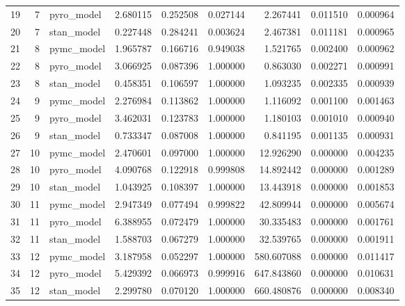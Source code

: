 \begin{tabular}{lrlrrrrrr}
19 & 7 & pyro_model & 2.680115 & 0.252508 & 0.027144 & 2.267441 & 0.011510 & 0.000964 \\
20 & 7 & stan_model & 0.227448 & 0.284241 & 0.003624 & 2.467381 & 0.011181 & 0.000965 \\
21 & 8 & pymc_model & 1.965787 & 0.166716 & 0.949038 & 1.521765 & 0.002400 & 0.000962 \\
22 & 8 & pyro_model & 3.066925 & 0.087396 & 1.000000 & 0.863030 & 0.002271 & 0.000991 \\
23 & 8 & stan_model & 0.458351 & 0.106597 & 1.000000 & 1.093235 & 0.002335 & 0.000939 \\
24 & 9 & pymc_model & 2.276984 & 0.113862 & 1.000000 & 1.116092 & 0.001100 & 0.001463 \\
25 & 9 & pyro_model & 3.462031 & 0.123783 & 1.000000 & 1.180103 & 0.001010 & 0.000940 \\
26 & 9 & stan_model & 0.733347 & 0.087008 & 1.000000 & 0.841195 & 0.001135 & 0.000931 \\
27 & 10 & pymc_model & 2.470601 & 0.097000 & 1.000000 & 12.926290 & 0.000000 & 0.004235 \\
28 & 10 & pyro_model & 4.090768 & 0.122918 & 0.999808 & 14.892442 & 0.000000 & 0.001289 \\
29 & 10 & stan_model & 1.043925 & 0.108397 & 1.000000 & 13.443918 & 0.000000 & 0.001853 \\
30 & 11 & pymc_model & 2.947349 & 0.077494 & 0.999822 & 42.809944 & 0.000000 & 0.005674 \\
31 & 11 & pyro_model & 6.388955 & 0.072479 & 1.000000 & 30.335483 & 0.000000 & 0.001761 \\
32 & 11 & stan_model & 1.588703 & 0.067279 & 1.000000 & 32.539765 & 0.000000 & 0.001911 \\
33 & 12 & pymc_model & 3.187958 & 0.052297 & 1.000000 & 580.607088 & 0.000000 & 0.011417 \\
34 & 12 & pyro_model & 5.429392 & 0.066973 & 0.999916 & 647.843860 & 0.000000 & 0.010631 \\
35 & 12 & stan_model & 2.299780 & 0.070120 & 1.000000 & 660.480876 & 0.000000 & 0.008340 \\
\bottomrule
\end{tabular}
